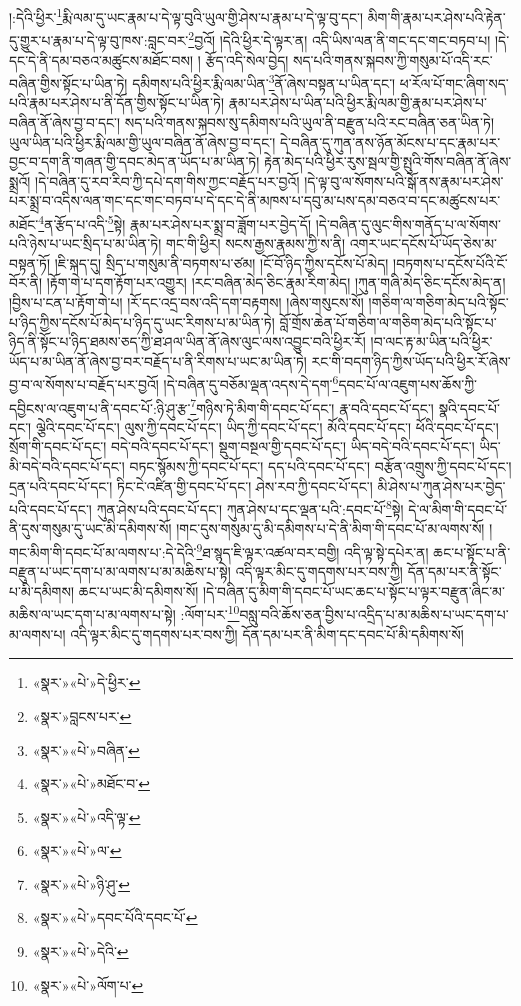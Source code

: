 །:དེའི་ཕྱིར་\footnote{«སྣར་»«པེ་»དེ་ཕྱིར་}རྨི་ལམ་དུ་ཡང་རྣམ་པ་དེ་ལྟ་བུའི་ཡུལ་གྱི་ཤེས་པ་རྣམ་པ་དེ་ལྟ་བུ་དང་། མིག་གི་རྣམ་པར་ཤེས་པའི་རྟེན་དུ་གྱུར་པ་རྣམ་པ་དེ་ལྟ་བུ་ཁས་:བླང་བར་\footnote{«སྣར་»བླངས་པར་}བྱའོ། །དེའི་ཕྱིར་དེ་ལྟར་ན། འདི་ཡིས་ལན་ནི་གང་དང་གང་བཏབ་པ། །དེ་དང་དེ་ནི་དམ་བཅའ་མཚུངས་མཐོང་བས། །
རྩོད་འདི་སེལ་བྱེད། སད་པའི་གནས་སྐབས་ཀྱི་གསུམ་པོ་འདི་རང་བཞིན་གྱིས་སྟོང་པ་ཡིན་ཏེ། དམིགས་པའི་ཕྱིར་རྨི་ལམ་ཡིན་\footnote{«སྣར་»«པེ་»བཞིན་}ནོ་ཞེས་བསྟན་པ་ཡིན་དང་། ཕ་རོལ་པོ་གང་ཞིག་སད་པའི་རྣམ་པར་ཤེས་པ་ནི་དོན་གྱིས་སྟོང་པ་ཡིན་ཏེ། རྣམ་པར་ཤེས་པ་ཡིན་པའི་ཕྱིར་རྨི་ལམ་གྱི་རྣམ་པར་ཤེས་པ་བཞིན་ནོ་ཞེས་བྱ་བ་དང་། སད་པའི་གནས་སྐབས་སུ་དམིགས་པའི་ཡུལ་ནི་བརྫུན་པའི་རང་བཞིན་ཅན་ཡིན་ཏེ། ཡུལ་ཡིན་པའི་ཕྱིར་རྨི་ལམ་གྱི་ཡུལ་བཞིན་ནོ་ཞེས་བྱ་བ་དང་། དེ་བཞིན་དུ་ཀུན་ནས་ཉོན་མོངས་པ་དང་རྣམ་པར་བྱང་བ་དག་ནི་གཞན་གྱི་དབང་མེད་ན་ཡོད་པ་མ་ཡིན་ཏེ། རྟེན་མེད་པའི་ཕྱིར་རུས་སྦལ་གྱི་སྤུའི་གོས་བཞིན་ནོ་ཞེས་སྨྲའོ། །དེ་བཞིན་དུ་རབ་རིབ་ཀྱི་དཔེ་དག་གིས་ཀྱང་བརྗོད་པར་བྱའོ། །དེ་ལྟ་བུ་ལ་སོགས་པའི་སྒོ་ནས་རྣམ་པར་ཤེས་པར་སྨྲ་བ་འདིས་ལན་གང་དང་གང་བཏབ་པ་དེ་དང་དེ་ནི་མཁས་པ་དབུ་མ་པས་དམ་བཅའ་བ་དང་མཚུངས་པར་མཐོང་\footnote{«སྣར་»«པེ་»མཐོང་བ་}ན་རྩོད་པ་འདི་\footnote{«སྣར་»«པེ་»འདི་ལྟ་}སྟེ། རྣམ་པར་ཤེས་པར་སྨྲ་བ་ཟློག་པར་བྱེད་དོ། །དེ་བཞིན་དུ་ལུང་གིས་གནོད་པ་ལ་སོགས་པའི་ཉེས་པ་ཡང་སྲིད་པ་མ་ཡིན་ཏེ། གང་གི་ཕྱིར། སངས་རྒྱས་རྣམས་ཀྱི་ས་ནི། འགར་ཡང་དངོས་པོ་ཡོད་ཅེས་མ་བསྟན་ཏོ། །ཇི་སྐད་དུ། སྲིད་པ་གསུམ་ནི་བཏགས་པ་ཙམ། །ངོ་བོ་ཉིད་ཀྱིས་དངོས་པོ་མེད། །བཏགས་པ་དངོས་པོའི་ངོ་བོར་ནི། །རྟོག་གེ་པ་དག་རྟོག་པར་འགྱུར། །རང་བཞིན་མེད་ཅིང་རྣམ་རིག་མེད། །ཀུན་གཞི་མེད་ཅིང་དངོས་མེད་ན། །བྱིས་པ་ངན་པ་རྟོག་གེ་པ། །རོ་དང་འདྲ་བས་འདི་དག་བརྟགས། །ཞེས་གསུངས་སོ། །གཅིག་ལ་གཅིག་མེད་པའི་སྟོང་པ་ཉིད་ཀྱིས་དངོས་པོ་མེད་པ་ཉིད་དུ་ཡང་རིགས་པ་མ་ཡིན་ཏེ། བློ་གྲོས་ཆེན་པོ་གཅིག་ལ་གཅིག་མེད་པའི་སྟོང་པ་ཉིད་ནི་སྟོང་པ་ཉིད་ཐམས་ཅད་ཀྱི་ཐ་ཤལ་ཡིན་ནོ་ཞེས་ལུང་ལས་འབྱུང་བའི་ཕྱིར་རོ། །བ་ལང་རྟ་མ་ཡིན་པའི་ཕྱིར་ཡོད་པ་མ་ཡིན་ནོ་ཞེས་བྱ་བར་བརྗོད་པ་ནི་རིགས་པ་ཡང་མ་ཡིན་ཏེ། རང་གི་བདག་ཉིད་ཀྱིས་ཡོད་པའི་ཕྱིར་རོ་ཞེས་བྱ་བ་ལ་སོགས་པ་བརྗོད་པར་བྱའོ། །དེ་བཞིན་དུ་བཅོམ་ལྡན་འདས་དེ་དག་\footnote{«སྣར་»«པེ་»ལ་}དབང་པོ་ལ་འཇུག་པས་ཆོས་ཀྱི་དབྱིངས་ལ་འཇུག་པ་ནི་དབང་པོ་:ཉི་ཤུ་རྩ་\footnote{«སྣར་»«པེ་»ཉི་ཤུ་}གཉིས་ཏེ་མིག་གི་དབང་པོ་དང་། རྣ་བའི་དབང་པོ་དང་། སྣའི་དབང་པོ་དང་། ལྕེའི་དབང་པོ་དང་། ལུས་ཀྱི་དབང་པོ་དང་། ཡིད་ཀྱི་དབང་པོ་དང་། མོའི་དབང་པོ་དང་། ཕོའི་དབང་པོ་དང་། སྲོག་གི་དབང་པོ་དང་། བདེ་བའི་དབང་པོ་དང་། སྡུག་བསྔལ་གྱི་དབང་པོ་དང་། ཡིད་བདེ་བའི་དབང་པོ་དང་། ཡིད་མི་བདེ་བའི་དབང་པོ་དང་། བཏང་སྙོམས་ཀྱི་དབང་པོ་དང་། དད་པའི་དབང་པོ་དང་། བརྩོན་འགྲུས་ཀྱི་དབང་པོ་དང་། དྲན་པའི་དབང་པོ་དང་། ཏིང་ངེ་འཛིན་གྱི་དབང་པོ་དང་། ཤེས་རབ་ཀྱི་དབང་པོ་དང་། མི་ཤེས་པ་ཀུན་ཤེས་པར་བྱེད་པའི་དབང་པོ་དང་། ཀུན་ཤེས་པའི་དབང་པོ་དང་། ཀུན་ཤེས་པ་དང་ལྡན་པའི་:དབང་པོ་\footnote{«སྣར་»«པེ་»དབང་པོའི་དབང་པོ་}སྟེ། དེ་ལ་མིག་གི་དབང་པོ་ནི་དུས་གསུམ་དུ་ཡང་མི་དམིགས་སོ། །གང་དུས་གསུམ་དུ་མི་དམིགས་པ་དེ་ནི་མིག་གི་དབང་པོ་མ་ལགས་སོ། །གང་མིག་གི་དབང་པོ་མ་ལགས་པ་:དེ་དེའི་\footnote{«སྣར་»«པེ་»དེའི་}ཐ་སྙད་ཇི་ལྟར་འཚལ་བར་བགྱི། འདི་ལྟ་སྟེ་དཔེར་ན། ཆང་པ་སྟོང་པ་ནི་བརྫུན་པ་ཡང་དག་པ་མ་ལགས་པ་མ་མཆིས་པ་སྟེ། འདི་ལྟར་མིང་དུ་གདགས་པར་བས་ཀྱི། དོན་དམ་པར་ནི་སྟོང་པ་མི་དམིགས། ཆང་པ་ཡང་མི་དམིགས་སོ། །དེ་བཞིན་དུ་མིག་གི་དབང་པོ་ཡང་ཆང་པ་སྟོང་པ་ལྟར་བརྫུན་ཞིང་མ་མཆིས་ལ་ཡང་དག་པ་མ་ལགས་པ་སྟེ། :ལོག་པར་\footnote{«སྣར་»«པེ་»ལོག་པ་}བསླུ་བའི་ཆོས་ཅན་བྱིས་པ་འདྲིད་པ་མ་མཆིས་པ་ཡང་དག་པ་མ་ལགས་པ། འདི་ལྟར་མིང་དུ་གདགས་པར་བས་ཀྱི། དོན་དམ་པར་ནི་མིག་དང་དབང་པོ་མི་དམིགས་སོ། 